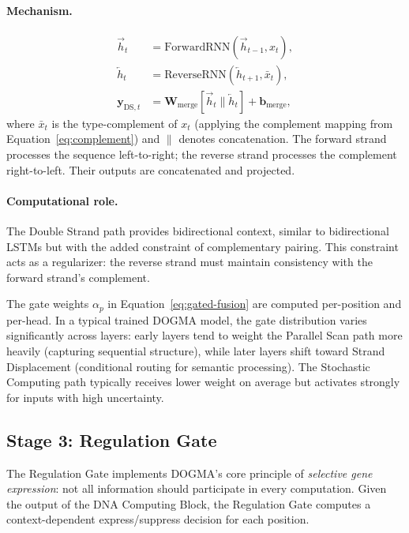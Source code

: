 \paragraph{Mechanism.}
\begin{align}
\vec{h}_t &= \mathrm{ForwardRNN}(\vec{h}_{t-1}, x_t), \label{eq:forward-strand} \\
\overleftarrow{h}_t &= \mathrm{ReverseRNN}(\overleftarrow{h}_{t+1}, \bar{x}_t), \label{eq:reverse-strand} \\
\mathbf{y}_{\text{DS},t} &= \mathbf{W}_{\text{merge}}[\vec{h}_t \| \overleftarrow{h}_t] + \mathbf{b}_{\text{merge}}, \label{eq:ds-merge}
\end{align}
where $\bar{x}_t$ is the type-complement of $x_t$ (applying the complement mapping from Equation~\ref{eq:complement}) and $\|$ denotes concatenation. The forward strand processes the sequence left-to-right; the reverse strand processes the complement right-to-left. Their outputs are concatenated and projected.

\paragraph{Computational role.} The Double Strand path provides bidirectional context, similar to bidirectional LSTMs but with the added constraint of complementary pairing. This constraint acts as a regularizer: the reverse strand must maintain consistency with the forward strand's complement.

\begin{implnote}
The gate weights $\alpha_p$ in Equation~\ref{eq:gated-fusion} are computed per-position and per-head. In a typical trained DOGMA model, the gate distribution varies significantly across layers: early layers tend to weight the Parallel Scan path more heavily (capturing sequential structure), while later layers shift toward Strand Displacement (conditional routing for semantic processing). The Stochastic Computing path typically receives lower weight on average but activates strongly for inputs with high uncertainty.
\end{implnote}

\subsection{Stage 3: Regulation Gate}
\label{sec:stage-regulation}

The Regulation Gate implements DOGMA's core principle of \emph{selective gene expression}: not all information should participate in every computation. Given the output of the DNA Computing Block, the Regulation Gate computes a context-dependent express/suppress decision for each position.

